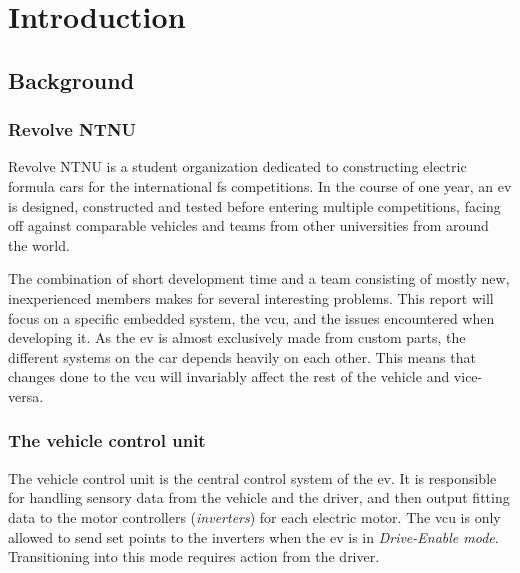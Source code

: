 \section{Introduction}

\subsection{Background}

\subsubsection{Revolve NTNU}

Revolve NTNU is a student organization dedicated to constructing electric formula cars for the international \acrfull{fs} competitions. In the course of one year, an \acrfull{ev} is designed, constructed and tested before entering multiple competitions, facing off against comparable vehicles and teams from other universities from around the world.

The combination of short development time and a team consisting of mostly new, inexperienced members makes for several interesting problems. This report will focus on a specific embedded system, the \acrfull{vcu}, and the issues encountered when developing it. As the \acrshort{ev} is almost exclusively made from custom parts, the different systems on the car depends heavily on each other. This means that changes done to the \acrshort{vcu} will invariably affect the rest of the vehicle and vice-versa. 


\subsubsection{The vehicle control unit}

The vehicle control unit is the central control system of the \acrshort{ev}. It is responsible for handling sensory data from the vehicle and the driver, and then output fitting data to the motor controllers (\emph{inverters}) for each electric motor. The \acrshort{vcu} is only allowed to send set points to the inverters when the \acrshort{ev} is in \emph{Drive-Enable mode}. Transitioning into this mode requires action from the driver.





